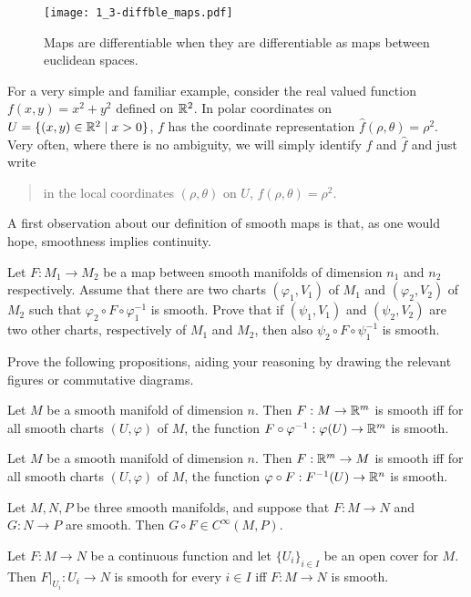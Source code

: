 \begin{figure}[htp]
  \centering
  \texttt{[image: 1\_3-diffble\_maps.pdf]}
  \caption{Maps are differentiable when they are differentiable as maps between euclidean spaces.}
  \label{fig:1.3-differentiable_maps}
\end{figure}

For a very simple and familiar example, consider the real valued function $f(x,y)= x^2+y^2$ defined on $\mathbb{R}^2$.
In polar coordinates on $U=\{(x,y)\in\mathbb{R}^2\mid x>0\}$, $f$ has the coordinate representation $\hat f (\rho, \theta) = \rho^2$.
Very often, where there is no ambiguity, we will simply identify $f$ and $\hat f$ and just write
\begin{quote}
  in the local coordinates $(\rho,\theta)$ on $U$, $f(\rho,\theta) = \rho^2$.
\end{quote}

A first observation about our definition of smooth maps is that, as one would hope, smoothness implies continuity.
%
\begin{exercise}
  Let $F:M_1\to M_2$ be a map between smooth manifolds of dimension $n_1$ and $n_2$ respectively.
  Assume that there are two charts $(\varphi_1, V_1)$ of $M_1$ and $(\varphi_2, V_2)$ of $M_2$ such that
  $\varphi_2\circ F\circ \varphi_1^{-1}$ is smooth.
  Prove that if $(\psi_1, V_1)$ and $(\psi_2, V_2)$ are two other charts,
  respectively of $M_1$ and $M_2$, then also $\psi_2\circ F\circ \psi_1^{-1}$ is smooth.
\end{exercise}
%
\begin{exercise}
  Prove the following propositions, aiding your reasoning by drawing the relevant figures or commutative diagrams.
  \begin{proposition}
    Let $M$ be a smooth manifold of dimension $n$.
    Then $F:M\to\mathbb{R}^m$ is smooth iff for all smooth charts $(U,\varphi)$ of $M$, the function $F\circ\varphi^{-1}:\varphi(U)\to\mathbb{R}^m$ is smooth.
  \end{proposition}
  \begin{proposition}
    Let $M$ be a smooth manifold of dimension $n$.
    Then $F:\mathbb{R}^m\to M$ is smooth iff for all smooth charts $(U,\varphi)$ of $M$, the function $\varphi\circ F:F^{-1}(U)\to\mathbb{R}^n$ is smooth.
  \end{proposition}
  \begin{proposition}
    Let $M, N, P$ be three smooth manifolds, and suppose that $F:M\to N$ and $G:N\to P$ are smooth.
    Then $G\circ F\in C^\infty(M, P)$.
  \end{proposition}

  \begin{proposition}\label{prop:smoothlocal}
    Let $F:M\to N$ be a continuous function and let $\{U_i\}_{i\in I}$ be an open cover for $M$. Then $F|_{U_i}:U_i \to N$ is smooth for every $i\in I$ iff $F:M\to N$ is smooth.
  \end{proposition}
\end{exercise}

